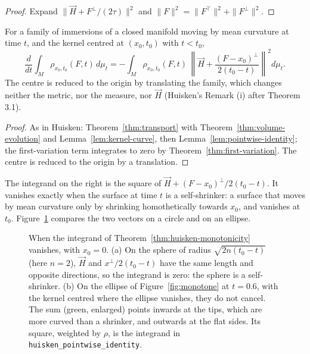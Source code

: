 \begin{proof}
  \leanok
  Expand $\|\vec H + F^\perp/(2\tau)\|^2$ and $\|F\|^2 = \|F^\top\|^2 + \|F^\perp\|^2$.
\end{proof}

\begin{theorem}
  \label{thm:huisken-monotonicity}
  \leanok
  For a family of immersions of a closed manifold moving by mean curvature at time $t$, and
  the kernel centred at $(x_0, t_0)$ with $t < t_0$,
  \[
    \frac{d}{dt}\int_M \rho_{x_0,t_0}(F, t)\,d\mu_t = -\int_M \rho_{x_0,t_0}(F, t)\,
      \left\| \vec H + \frac{(F - x_0)^\perp}{2(t_0 - t)} \right\|^2 d\mu_t.
  \]
  The centre is reduced to the origin by translating the family, which changes neither the
  metric, nor the measure, nor $\vec H$ (Huisken's Remark (i) after Theorem 3.1).
\end{theorem}

\begin{proof}
  \leanok
  As in Huisken: Theorem~\ref{thm:transport} with Theorem~\ref{thm:volume-evolution} and Lemma~\ref{lem:kernel-curve}, then Lemma~\ref{lem:pointwise-identity}; the first-variation term integrates to zero by Theorem~\ref{thm:first-variation}. The centre is reduced to the origin by a translation.
\end{proof}

The integrand on the right is the square of $\vec H + (F - x_0)^\perp / 2(t_0 - t)$. It
vanishes exactly when the surface at time $t$ is a self-shrinker: a surface that moves by
mean curvature only by shrinking homothetically towards $x_0$, and vanishes at $t_0$.
Figure~\ref{fig:integrand} compares the two vectors on a circle and on an ellipse.

\begin{figure}[htbp]
\centering
{}
\caption{When the integrand of Theorem~\ref{thm:huisken-monotonicity} vanishes, with
$x_0 = 0$. (a) On the sphere of radius $\sqrt{2n(t_0 - t)}$ (here $n = 2$), $\vec H$ and
$x^\perp/2(t_0 - t)$ have the same length and opposite directions, so the integrand is zero:
the sphere is a self-shrinker. (b) On the ellipse of Figure~\ref{fig:monotone} at $t = 0.6$,
with the kernel centred where the ellipse vanishes, they do not cancel. The sum (green,
enlarged) points inwards at the tips, which are more curved than a shrinker, and outwards
at the flat sides. Its square, weighted by $\rho$, is the integrand in
\texttt{huisken\_pointwise\_identity}.}
\label{fig:integrand}
\end{figure}

